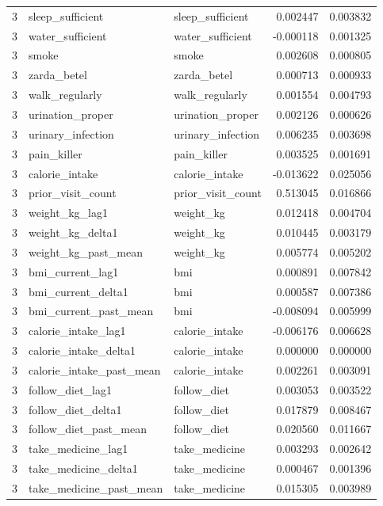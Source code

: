 \begin{longtable}{rllrr}
3 & sleep\_sufficient & sleep\_sufficient & 0.002447 & 0.003832 \\
3 & water\_sufficient & water\_sufficient & -0.000118 & 0.001325 \\
3 & smoke & smoke & 0.002608 & 0.000805 \\
3 & zarda\_betel & zarda\_betel & 0.000713 & 0.000933 \\
3 & walk\_regularly & walk\_regularly & 0.001554 & 0.004793 \\
3 & urination\_proper & urination\_proper & 0.002126 & 0.000626 \\
3 & urinary\_infection & urinary\_infection & 0.006235 & 0.003698 \\
3 & pain\_killer & pain\_killer & 0.003525 & 0.001691 \\
3 & calorie\_intake & calorie\_intake & -0.013622 & 0.025056 \\
3 & prior\_visit\_count & prior\_visit\_count & 0.513045 & 0.016866 \\
3 & weight\_kg\_lag1 & weight\_kg & 0.012418 & 0.004704 \\
3 & weight\_kg\_delta1 & weight\_kg & 0.010445 & 0.003179 \\
3 & weight\_kg\_past\_mean & weight\_kg & 0.005774 & 0.005202 \\
3 & bmi\_current\_lag1 & bmi & 0.000891 & 0.007842 \\
3 & bmi\_current\_delta1 & bmi & 0.000587 & 0.007386 \\
3 & bmi\_current\_past\_mean & bmi & -0.008094 & 0.005999 \\
3 & calorie\_intake\_lag1 & calorie\_intake & -0.006176 & 0.006628 \\
3 & calorie\_intake\_delta1 & calorie\_intake & 0.000000 & 0.000000 \\
3 & calorie\_intake\_past\_mean & calorie\_intake & 0.002261 & 0.003091 \\
3 & follow\_diet\_lag1 & follow\_diet & 0.003053 & 0.003522 \\
3 & follow\_diet\_delta1 & follow\_diet & 0.017879 & 0.008467 \\
3 & follow\_diet\_past\_mean & follow\_diet & 0.020560 & 0.011667 \\
3 & take\_medicine\_lag1 & take\_medicine & 0.003293 & 0.002642 \\
3 & take\_medicine\_delta1 & take\_medicine & 0.000467 & 0.001396 \\
3 & take\_medicine\_past\_mean & take\_medicine & 0.015305 & 0.003989 \\

\end{longtable}
